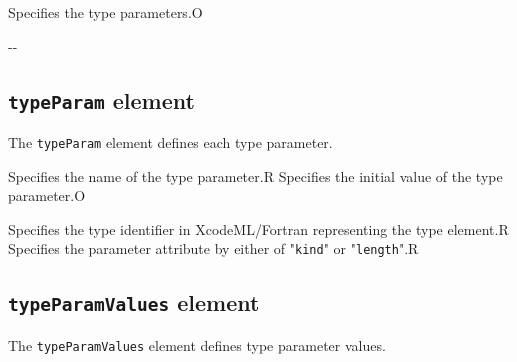 
\begin{XcodeMLChildElements}
{Specifies the type parameters.}{O}
\end{XcodeMLChildElements}

\begin{XcodeMLAttributes}
\XcodeMLAttrDef{-}{-}
{-}{-}
\end{XcodeMLAttributes}


\subsection{ {\tt typeParam} element}

The {\tt typeParam} element defines each type parameter.


\begin{XcodeMLChildElements}
{Specifies the name of the type parameter.}{R}
{Specifies the initial value of the type parameter.}{O}
\end{XcodeMLChildElements}

\begin{XcodeMLAttributes}
{Specifies the type identifier in XcodeML/Fortran representing the type element.}{R}
{Specifies the parameter attribute by either of "{\tt kind}" or "{\tt length}".}{R}
\end{XcodeMLAttributes}


\subsection{ {\tt typeParamValues} element}

The {\tt typeParamValues} element defines type parameter values.


